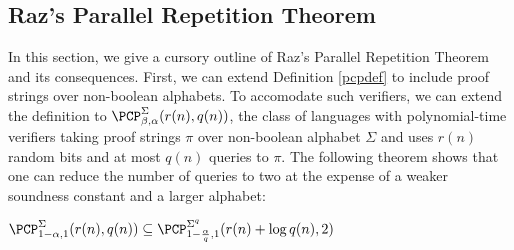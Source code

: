
\subsection{Raz's Parallel Repetition Theorem}
In this section, we give a cursory outline of Raz's Parallel Repetition Theorem and its consequences. First, we can extend Definition \ref{pcpdef} to include proof strings over non-boolean alphabets.
%
To accomodate such verifiers, we can extend the definition to $\PCP^\Sigma_{\beta, \alpha}(r(n),q(n))$, the class of languages with polynomial-time verifiers taking proof strings $\pi$ over non-boolean alphabet $\Sigma$ and uses $r(n)$ random bits and at most $q(n)$ queries to $\pi$.
%
The following theorem shows that one can reduce the number of queries to two at the expense of a weaker soundness constant and a larger alphabet:
%
\begin{theorem} \label{2queryinclusion}
  $\PCP^\Sigma_{1 - \alpha, 1}(r(n),q(n)) \subseteq \PCP^{\Sigma^q}_{1 - \frac{\alpha}{q},1}(r(n) + \log{q(n)}, 2)$
\end{theorem}
%
